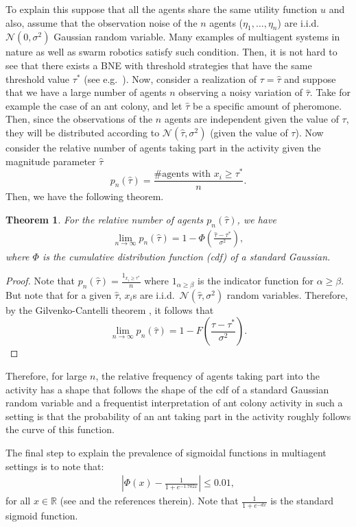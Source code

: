 \documentclass[conference]{ieeeconf}
\newtheorem{theorem}{Theorem}
\def\R{\mathbb{R}}
\begin{document}
To explain this suppose that all the agents share the same utility function $u$ and also, assume that the observation noise of the $n$ agents ($\eta_1,\ldots,\eta_n$) are i.i.d.\ $\mathcal{N}(0,\sigma^2)$ Gaussian random variable. Many examples of multiagent systems in nature as well as swarm robotics satisfy such condition. Then, it is not hard to see that there exists a BNE with threshold strategies that have the same threshold value $\tau^*$ (see e.g.\ \cite{Morris2000}). Now, consider a realization of $\tau=\hat{\tau}$ and suppose that we have a large number of agents $n$ observing a noisy variation of $\hat{\tau}$. Take for example the case of an ant colony, and let $\hat{\tau}$ be a specific amount of pheromone. Then, since the observations of the $n$ agents are independent given the value of $\tau$, they will be distributed according to $\mathcal{N}(\hat{\tau},\sigma^2)$ (given the value of $\tau$). Now consider the relative number of agents taking part in the activity given the magnitude parameter $\hat{\tau}$
\[p_n(\hat{\tau})=\frac{\#\text{agents with }x_i\geq \tau^*}{n}.\]
Then, we have the following theorem.
\begin{theorem}\label{thrm:relativefrequency}
For the relative number of agents $p_n(\hat{\tau})$, we have
\begin{align*}
\lim_{n\to\infty}p_n(\hat{\tau})=1-\Phi(\frac{\hat{\tau}-\tau^*}{\sigma^2}),
\end{align*}
where $\Phi$ is the cumulative distribution function (cdf) of a standard Gaussian. 
\end{theorem}
\begin{proof}
Note that $p_n(\hat{\tau})=\frac{1_{x_i\geq \tau^*}}{n}$ where $1_{\alpha\geq \beta}$ is the indicator function for $\alpha\geq \beta$. But note that for a given $\hat{\tau}$, $x_i$s are i.i.d.\ $\mathcal{N}(\hat{\tau},\sigma^2)$ random variables. Therefore, by the Gilvenko-Cantelli theorem \cite{durrett2010}, it follows that 
\[\lim_{n\to\infty}p_n(\hat{\tau})=1-F(\frac{\hat{\tau}-\tau^*}{\sigma^2}).\]
\end{proof}
Therefore, for large $n$, the relative frequency of agents taking part into the activity has a shape that follows the shape of the cdf of a standard Gaussian random variable and a frequentist interpretation of ant colony activity in such a setting is that the probability of an ant taking part in the activity roughly follows the curve of this function. 

The final step to explain the prevalence of sigmoidal functions in multiagent settings is to note that:
\begin{align*}
|\Phi(x)-\frac{1}{1+e^{-1.702x}}|\leq 0.01,
\end{align*}
for all $x\in\R$ (see \cite{camilli1994} and the references therein). Note that $\frac{1}{1+e^{-dx}}$ is the standard sigmoid function. 
\end{document}
